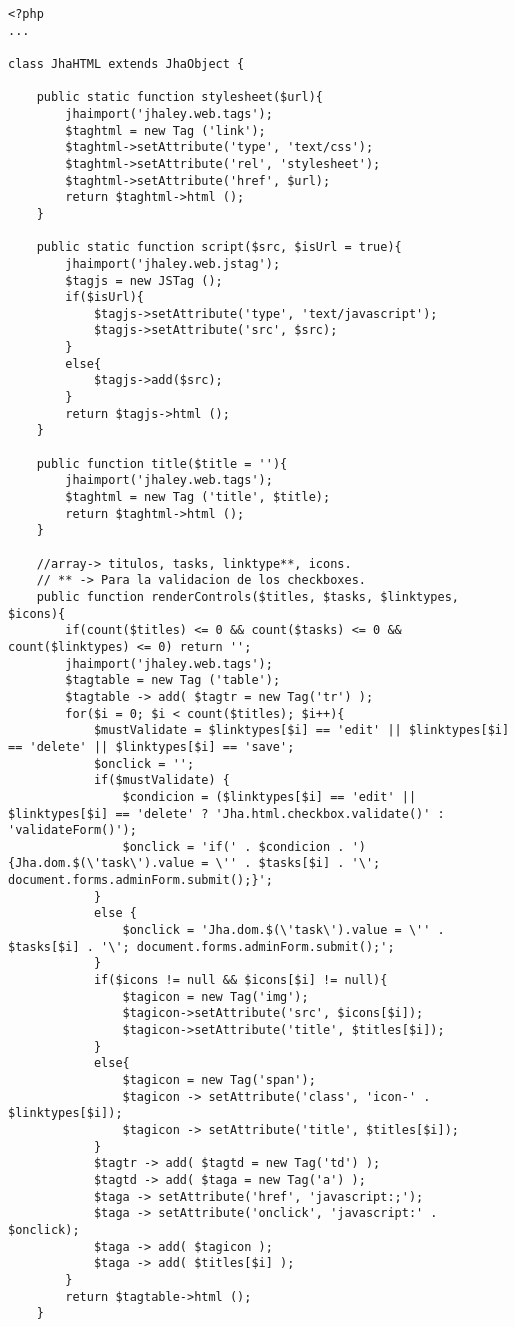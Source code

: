 \begin{lstlisting}[label=jha_renderer_head,caption=Renderizador para el tag HTML `head'.]
<?php
...

class JhaHTML extends JhaObject {
    
    public static function stylesheet($url){
    	jhaimport('jhaley.web.tags');
        $taghtml = new Tag ('link');
        $taghtml->setAttribute('type', 'text/css');
        $taghtml->setAttribute('rel', 'stylesheet');
        $taghtml->setAttribute('href', $url);
        return $taghtml->html ();
    }
    
    public static function script($src, $isUrl = true){
    	jhaimport('jhaley.web.jstag');
        $tagjs = new JSTag ();
        if($isUrl){
            $tagjs->setAttribute('type', 'text/javascript');
            $tagjs->setAttribute('src', $src);
        }
        else{
            $tagjs->add($src);
        }
        return $tagjs->html ();
    }
    
    public function title($title = ''){
    	jhaimport('jhaley.web.tags');
    	$taghtml = new Tag ('title', $title);
    	return $taghtml->html ();
    }
    
    //array-> titulos, tasks, linktype**, icons.  
    // ** -> Para la validacion de los checkboxes.
    public function renderControls($titles, $tasks, $linktypes, $icons){
    	if(count($titles) <= 0 && count($tasks) <= 0 && count($linktypes) <= 0) return '';
    	jhaimport('jhaley.web.tags');
    	$tagtable = new Tag ('table');
    	$tagtable -> add( $tagtr = new Tag('tr') );
        for($i = 0; $i < count($titles); $i++){
        	$mustValidate = $linktypes[$i] == 'edit' || $linktypes[$i] == 'delete' || $linktypes[$i] == 'save';
        	$onclick = '';
        	if($mustValidate) {
        		$condicion = ($linktypes[$i] == 'edit' || $linktypes[$i] == 'delete' ? 'Jha.html.checkbox.validate()' : 'validateForm()');
        		$onclick = 'if(' . $condicion . '){Jha.dom.$(\'task\').value = \'' . $tasks[$i] . '\'; document.forms.adminForm.submit();}';
        	}
        	else {
        		$onclick = 'Jha.dom.$(\'task\').value = \'' . $tasks[$i] . '\'; document.forms.adminForm.submit();';
        	}
            if($icons != null && $icons[$i] != null){
            	$tagicon = new Tag('img');
            	$tagicon->setAttribute('src', $icons[$i]);
            	$tagicon->setAttribute('title', $titles[$i]);
            }
            else{
            	$tagicon = new Tag('span');
            	$tagicon -> setAttribute('class', 'icon-' . $linktypes[$i]);
            	$tagicon -> setAttribute('title', $titles[$i]);
            }
            $tagtr -> add( $tagtd = new Tag('td') );
            $tagtd -> add( $taga = new Tag('a') );
            $taga -> setAttribute('href', 'javascript:;');
            $taga -> setAttribute('onclick', 'javascript:' . $onclick);
            $taga -> add( $tagicon );
            $taga -> add( $titles[$i] );
        }
        return $tagtable->html ();
    }
    

\end{lstlisting}
